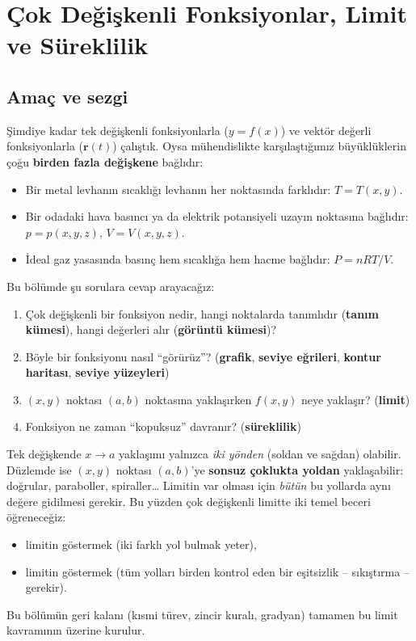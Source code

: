 \section{Çok Değişkenli Fonksiyonlar, Limit ve Süreklilik}

\subsection{Amaç ve sezgi}

Şimdiye kadar tek değişkenli fonksiyonlarla ($y=f(x)$) ve vektör değerli fonksiyonlarla ($\mathbf r(t)$) çalıştık. Oysa
mühendislikte karşılaştığımız büyüklüklerin çoğu \textbf{birden fazla değişkene} bağlıdır:

\begin{itemize}
  \item Bir metal levhanın sıcaklığı levhanın her noktasında farklıdır: $T=T(x,y)$.
  \item Bir odadaki hava basıncı ya da elektrik potansiyeli uzayın noktasına bağlıdır: $p=p(x,y,z)$, $V=V(x,y,z)$.
  \item İdeal gaz yasasında basınç hem sıcaklığa hem hacme bağlıdır: $P=nRT/V$.
\end{itemize}

Bu bölümde şu sorulara cevap arayacağız:

\begin{enumerate}
  \item Çok değişkenli bir fonksiyon nedir, hangi noktalarda tanımlıdır (\textbf{tanım kümesi}), hangi değerleri alır
        (\textbf{görüntü kümesi})?
  \item Böyle bir fonksiyonu nasıl ``görürüz''? (\textbf{grafik}, \textbf{seviye eğrileri}, \textbf{kontur haritası},
        \textbf{seviye yüzeyleri})
  \item $(x,y)$ noktası $(a,b)$ noktasına yaklaşırken $f(x,y)$ neye yaklaşır? (\textbf{limit})
  \item Fonksiyon ne zaman ``kopuksuz'' davranır? (\textbf{süreklilik})
\end{enumerate}

\begin{bilgi}
Tek değişkende $x\to a$ yaklaşımı yalnızca \emph{iki yönden} (soldan ve sağdan) olabilir. Düzlemde ise $(x,y)$ noktası
$(a,b)$'ye \textbf{sonsuz çoklukta yoldan} yaklaşabilir: doğrular, paraboller, spiraller\dots{} Limitin var olması için
\emph{bütün} bu yollarda aynı değere gidilmesi gerekir. Bu yüzden çok değişkenli limitte iki temel beceri öğreneceğiz:
\begin{itemize}
  \item limitin  göstermek (iki farklı yol bulmak yeter),
  \item limitin  göstermek (tüm yolları birden kontrol eden bir eşitsizlik -- sıkıştırma -- gerekir).
\end{itemize}
Bu bölümün geri kalanı (kısmi türev, zincir kuralı, gradyan) tamamen bu limit kavramının üzerine kurulur.
\end{bilgi}

